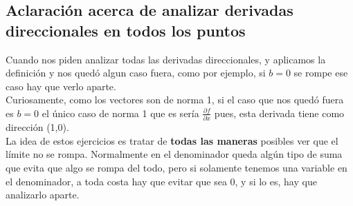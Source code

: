 \documentclass[10pt,a4paper]{article}
\begin{document}
\subsection*{Aclaración acerca de analizar derivadas direccionales en \textbf{todos} los puntos}
Cuando nos piden analizar todas las derivadas direccionales, y aplicamos la definición y nos quedó algun caso fuera, como por ejemplo, si $b = 0$ se rompe ese caso hay que verlo aparte. \\
Curiosamente, como los vectores son de norma 1, si el caso que nos quedó fuera es $b=0$ el único caso de norma 1 que es sería $\frac{\partial f}{\partial x}$ pues, esta derivada tiene como dirección (1,0). \\
La idea de estos ejercicios es tratar de \textbf{todas las maneras} posibles ver que el límite no se rompa. Normalmente en el denominador queda algún tipo de suma que evita que algo se rompa del todo, pero si solamente tenemos una variable en el denominador, a toda costa hay que evitar que sea 0, y si lo es, hay que analizarlo aparte. 
\end{document}
